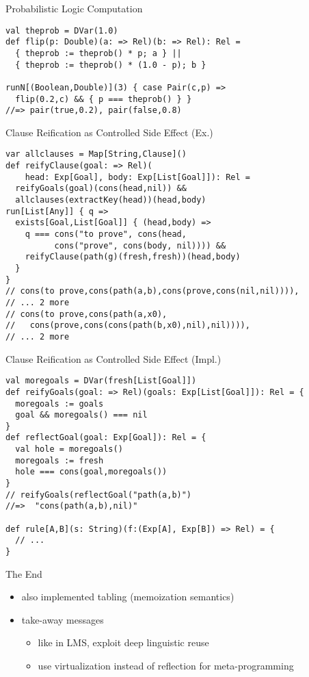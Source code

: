 \documentclass{beamer}
\begin{document}
\begin{frame}[fragile]{Probabilistic Logic Computation}
\begin{verbatim}
val theprob = DVar(1.0)
def flip(p: Double)(a: => Rel)(b: => Rel): Rel =
  { theprob := theprob() * p; a } ||
  { theprob := theprob() * (1.0 - p); b }

runN[(Boolean,Double)](3) { case Pair(c,p) =>
  flip(0.2,c) && { p === theprob() } }
//=> pair(true,0.2), pair(false,0.8)
\end{verbatim}
\end{frame}

\begin{frame}[fragile]{Clause Reification as Controlled Side Effect (Ex.)}
\begin{verbatim}
var allclauses = Map[String,Clause]()
def reifyClause(goal: => Rel)(
    head: Exp[Goal], body: Exp[List[Goal]]): Rel =
  reifyGoals(goal)(cons(head,nil)) &&
  allclauses(extractKey(head))(head,body)
run[List[Any]] { q =>
  exists[Goal,List[Goal]] { (head,body) =>
    q === cons("to prove", cons(head, 
          cons("prove", cons(body, nil)))) &&
    reifyClause(path(g)(fresh,fresh))(head,body)
  }
}
// cons(to prove,cons(path(a,b),cons(prove,cons(nil,nil)))),
// ... 2 more
// cons(to prove,cons(path(a,x0),
//   cons(prove,cons(cons(path(b,x0),nil),nil)))), 
// ... 2 more
\end{verbatim}
\end{frame}

\begin{frame}[fragile]{Clause Reification as Controlled Side Effect (Impl.)}
\begin{verbatim}
val moregoals = DVar(fresh[List[Goal]])
def reifyGoals(goal: => Rel)(goals: Exp[List[Goal]]): Rel = {
  moregoals := goals
  goal && moregoals() === nil
}
def reflectGoal(goal: Exp[Goal]): Rel = {
  val hole = moregoals()
  moregoals := fresh
  hole === cons(goal,moregoals())
}
// reifyGoals(reflectGoal("path(a,b)")
//=>  "cons(path(a,b),nil)"

def rule[A,B](s: String)(f:(Exp[A], Exp[B]) => Rel) = {
  // ...
}
\end{verbatim}
\end{frame}

\begin{frame}[fragile]{The End}
\begin{itemize}
\item also implemented tabling (memoization semantics)
\item take-away messages
\begin{itemize}
\item like in LMS, exploit deep linguistic reuse
\item use virtualization instead of reflection for meta-programming
\end{itemize}
\end{itemize}
\end{frame}
\end{document}
